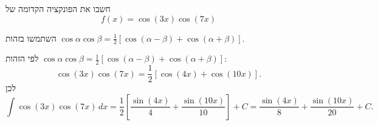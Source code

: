 
\begin{question}
חשבו את הפונקציה הקדומה של
\[ f(x)=\cos(3x)\cos(7x) \]
\end{question}

\begin{hint}
השתמשו בזהות $\cos\alpha\cos\beta=\frac12\left[\cos(\alpha-\beta)+\cos(\alpha+\beta)\right]$.
\end{hint}

\begin{solution}
לפי הזהות $\cos\alpha\cos\beta=\frac12\left[\cos(\alpha-\beta)+\cos(\alpha+\beta)\right]$:
\[ \cos(3x)\cos(7x)=\frac12\left[\cos(4x)+\cos(10x)\right]. \]
לכן
\[ \int\cos(3x)\cos(7x)\,dx=\frac12\left[\frac{\sin(4x)}{4}+\frac{\sin(10x)}{10}\right]+C=\boxed{\frac{\sin(4x)}{8}+\frac{\sin(10x)}{20}+C}. \]
\end{solution}
